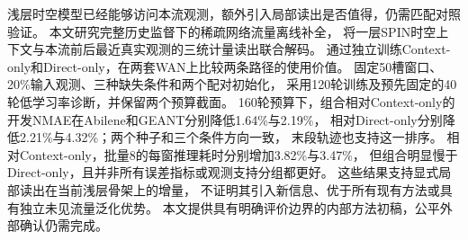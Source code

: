 浅层时空模型已经能够访问本流观测，额外引入局部读出是否值得，仍需匹配对照验证。
本文研究完整历史监督下的稀疏网络流量离线补全，
将一层SPIN时空上下文与本流前后最近真实观测的三统计量读出联合解码。
通过独立训练Context-only和Direct-only，在两套WAN上比较两条路径的使用价值。
固定50槽窗口、20\%输入观测、三种缺失条件和两个配对初始化，
采用120轮训练及预先固定的40轮低学习率诊断，并保留两个预算截面。
160轮预算下，组合相对Context-only的开发NMAE在Abilene和GEANT分别降低1.64\%与2.19\%，
相对Direct-only分别降低2.21\%与4.32\%；两个种子和三个条件方向一致，
末段轨迹也支持这一排序。
相对Context-only，批量8的每窗推理耗时分别增加3.82\%与3.47\%，
但组合明显慢于Direct-only，且并非所有误差指标或观测支持分组都更好。
这些结果支持显式局部读出在当前浅层骨架上的增量，
不证明其引入新信息、优于所有现有方法或具有独立未见流量泛化优势。
本文提供具有明确评价边界的内部方法初稿，公平外部确认仍需完成。
